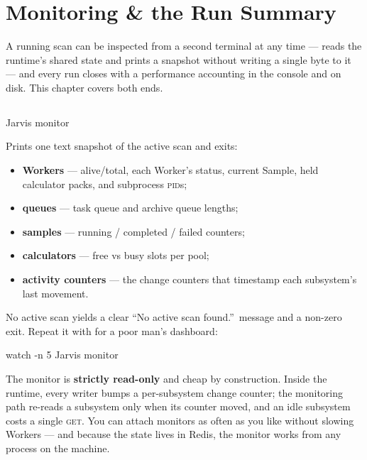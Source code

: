 \chapter{Monitoring \& the Run Summary}
\label{ch:monitoring}

 A running scan can be inspected from a
second terminal at any time ---  reads the runtime's shared state
and prints a snapshot without writing a single byte to it --- and every run closes with
a performance accounting in the console and on disk. This chapter covers both ends.

\section{}
\label{sec:monitor-cli}

\begin{terminal}
\begin{jcmd}
Jarvis monitor
\end{jcmd}
\end{terminal}

Prints one text snapshot of the active scan and exits:

\begin{itemize}
  \item \textbf{Workers} --- alive/total, each Worker's status, current Sample, held
        calculator packs, and subprocess \textsc{pid}s;
  \item \textbf{queues} --- task queue and archive queue lengths;
  \item \textbf{samples} --- running / completed / failed counters;
  \item \textbf{calculators} --- free vs busy slots per pool;
  \item \textbf{activity counters} --- the change counters that timestamp each
        subsystem's last movement.
\end{itemize}

No active scan yields a clear ``No active scan found.''\ message and a non-zero exit.
Repeat it with  for a poor man's dashboard:

\begin{terminal}
\begin{jcmd}
watch -n 5 Jarvis monitor
\end{jcmd}
\end{terminal}

\begin{jnote}
The monitor is \textbf{strictly read-only} and cheap by construction. Inside the
runtime, every writer bumps a per-subsystem change counter; the monitoring path
re-reads a subsystem only when its counter moved, and an idle subsystem costs a single
\textsc{get}. You can attach monitors as often as you like without slowing Workers ---
and because the state lives in Redis, the monitor works from any process on the
machine.
\end{jnote}


